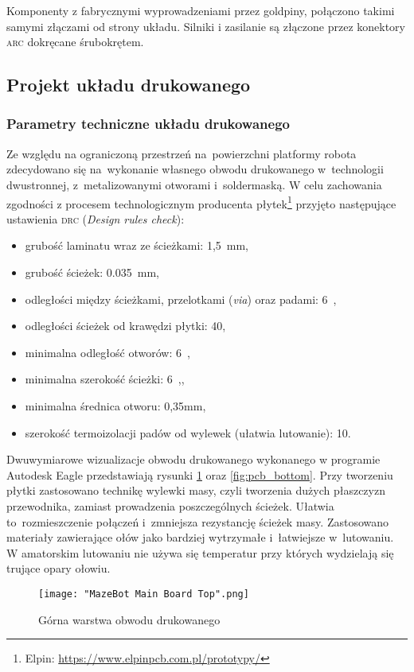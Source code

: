 \documentclass[11pt]{article}
\begin{document}
Komponenty z fabrycznymi wyprowadzeniami przez goldpiny, połączono takimi samymi złączami od strony układu.
Silniki i zasilanie są złączone przez konektory \textsc{arc} dokręcane śrubokrętem.

\subsection{Projekt układu drukowanego}
\subsubsection{Parametry techniczne układu drukowanego}
Ze względu na ograniczoną przestrzeń na~powierzchni platformy robota zdecydowano się na~wykonanie własnego obwodu drukowanego w~technologii dwustronnej, z~metalizowanymi otworami i~soldermaską.
W celu zachowania zgodności z procesem technologicznym producenta płytek\footnote{Elpin: \url{https://www.elpinpcb.com.pl/prototypy/}}
przyjęto następujące ustawienia \textsc{drc} (\textit{Design rules check}):
\begin{itemize}
	\item grubość laminatu wraz ze ścieżkami: 1,5~\si{\milli\meter},
	\item grubość ścieżek: 0.035~\si{\milli\meter},
	\item odległości między ścieżkami, przelotkami (\textit{via}) oraz padami: 6~\si{\mil},
	\item odległości ścieżek od krawędzi płytki: 40\si{\mil},
	\item minimalna odległość otworów: 6~\si{\mil},
	\item minimalna szerokość ścieżki: 6~\si{\mil},,
	\item minimalna średnica otworu: 0,35\si{\milli\meter},
	\item szerokość termoizolacji padów od wylewek (ułatwia lutowanie): 10\si{\mil}.
\end{itemize}
Dwuwymiarowe wizualizacje obwodu drukowanego wykonanego w programie Autodesk Eagle przedstawiają rysunki \ref{fig:pcb_top} oraz \ref{fig:pcb_bottom}.
Przy tworzeniu płytki zastosowano technikę wylewki masy, czyli tworzenia dużych płaszczyzn przewodnika, zamiast prowadzenia poszczególnych ścieżek.
Ułatwia to~rozmieszczenie połączeń i~zmniejsza rezystancję ścieżek masy.
Zastosowano materiały zawierające ołów jako bardziej wytrzymałe i~łatwiejsze w~lutowaniu.
W amatorskim lutowaniu nie używa się temperatur przy których wydzielają się trujące opary ołowiu.

\begin{figure}[!htbp]
	\centering
	\texttt{[image: "MazeBot Main Board Top".png]}
	\caption{Górna warstwa obwodu drukowanego}
	\label{fig:pcb_top}
\end{figure}
\end{document}
